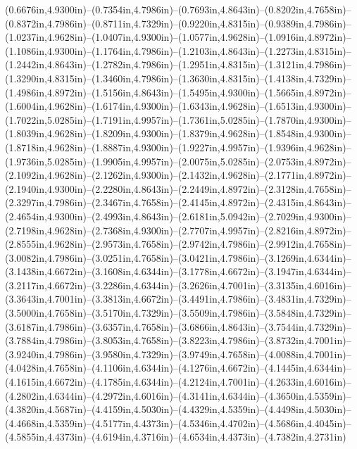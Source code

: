 (0.6676in,4.9300in)--(0.7354in,4.7986in)--(0.7693in,4.8643in)--(0.8202in,4.7658in)--(0.8372in,4.7986in)--(0.8711in,4.7329in)--(0.9220in,4.8315in)--(0.9389in,4.7986in)--(1.0237in,4.9628in)--(1.0407in,4.9300in)--(1.0577in,4.9628in)--(1.0916in,4.8972in)--(1.1086in,4.9300in)--(1.1764in,4.7986in)--(1.2103in,4.8643in)--(1.2273in,4.8315in)--(1.2442in,4.8643in)--(1.2782in,4.7986in)--(1.2951in,4.8315in)--(1.3121in,4.7986in)--(1.3290in,4.8315in)--(1.3460in,4.7986in)--(1.3630in,4.8315in)--(1.4138in,4.7329in)--(1.4986in,4.8972in)--(1.5156in,4.8643in)--(1.5495in,4.9300in)--(1.5665in,4.8972in)--(1.6004in,4.9628in)--(1.6174in,4.9300in)--(1.6343in,4.9628in)--(1.6513in,4.9300in)--(1.7022in,5.0285in)--(1.7191in,4.9957in)--(1.7361in,5.0285in)--(1.7870in,4.9300in)--(1.8039in,4.9628in)--(1.8209in,4.9300in)--(1.8379in,4.9628in)--(1.8548in,4.9300in)--(1.8718in,4.9628in)--(1.8887in,4.9300in)--(1.9227in,4.9957in)--(1.9396in,4.9628in)--(1.9736in,5.0285in)--(1.9905in,4.9957in)--(2.0075in,5.0285in)--(2.0753in,4.8972in)--(2.1092in,4.9628in)--(2.1262in,4.9300in)--(2.1432in,4.9628in)--(2.1771in,4.8972in)--(2.1940in,4.9300in)--(2.2280in,4.8643in)--(2.2449in,4.8972in)--(2.3128in,4.7658in)--(2.3297in,4.7986in)--(2.3467in,4.7658in)--(2.4145in,4.8972in)--(2.4315in,4.8643in)--(2.4654in,4.9300in)--(2.4993in,4.8643in)--(2.6181in,5.0942in)--(2.7029in,4.9300in)--(2.7198in,4.9628in)--(2.7368in,4.9300in)--(2.7707in,4.9957in)--(2.8216in,4.8972in)--(2.8555in,4.9628in)--(2.9573in,4.7658in)--(2.9742in,4.7986in)--(2.9912in,4.7658in)--(3.0082in,4.7986in)--(3.0251in,4.7658in)--(3.0421in,4.7986in)--(3.1269in,4.6344in)--(3.1438in,4.6672in)--(3.1608in,4.6344in)--(3.1778in,4.6672in)--(3.1947in,4.6344in)--(3.2117in,4.6672in)--(3.2286in,4.6344in)--(3.2626in,4.7001in)--(3.3135in,4.6016in)--(3.3643in,4.7001in)--(3.3813in,4.6672in)--(3.4491in,4.7986in)--(3.4831in,4.7329in)--(3.5000in,4.7658in)--(3.5170in,4.7329in)--(3.5509in,4.7986in)--(3.5848in,4.7329in)--(3.6187in,4.7986in)--(3.6357in,4.7658in)--(3.6866in,4.8643in)--(3.7544in,4.7329in)--(3.7884in,4.7986in)--(3.8053in,4.7658in)--(3.8223in,4.7986in)--(3.8732in,4.7001in)--(3.9240in,4.7986in)--(3.9580in,4.7329in)--(3.9749in,4.7658in)--(4.0088in,4.7001in)--(4.0428in,4.7658in)--(4.1106in,4.6344in)--(4.1276in,4.6672in)--(4.1445in,4.6344in)--(4.1615in,4.6672in)--(4.1785in,4.6344in)--(4.2124in,4.7001in)--(4.2633in,4.6016in)--(4.2802in,4.6344in)--(4.2972in,4.6016in)--(4.3141in,4.6344in)--(4.3650in,4.5359in)--(4.3820in,4.5687in)--(4.4159in,4.5030in)--(4.4329in,4.5359in)--(4.4498in,4.5030in)--(4.4668in,4.5359in)--(4.5177in,4.4373in)--(4.5346in,4.4702in)--(4.5686in,4.4045in)--(4.5855in,4.4373in)--(4.6194in,4.3716in)--(4.6534in,4.4373in)--(4.7382in,4.2731in) 